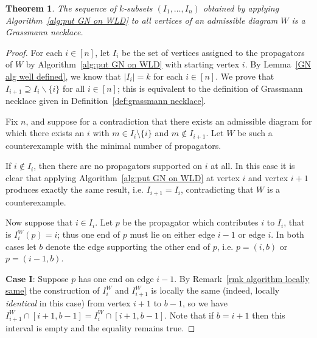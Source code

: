 \documentclass[11pt]{article}
\newcommand{\note}{\todo[color=green!40]}
\def\bas #1\eas{\begin{align*} #1 \end{align*}}
\newtheorem{thm}{Theorem}[section]
\theoremstyle{remark}
\theoremstyle{definition}
\begin{document}
\begin{thm}\label{res:alg gives GN}
The sequence of $k$-subsets $(I_1,\dots,I_n)$ obtained by applying Algorithm~\ref{alg:put GN on WLD} to all vertices of an admissible diagram $W$ is a Grassmann necklace.
\end{thm}
\begin{proof}
For each $i \in [n]$, let $I_i$ be the set of vertices assigned to the propagators of $W$ by Algorithm~\ref{alg:put GN on WLD} with starting vertex $i$. By Lemma~\ref{GN alg well defined}, we know that $|I_i| = k$ for each $i \in [n]$. We prove that $I_{i+1} \supseteq I_i \backslash \{i\}$ for all $i \in [n]$; this is equivalent to the definition of Grassmann necklace given in Definition~\ref{def:grassmann necklace}.

Fix $n$, and suppose for a contradiction that there exists an admissible diagram for which there exists an $i$ with $m\in I_i\setminus \{i\}$ and $m \not\in I_{i+1}$.  Let $W$ be such a counterexample with the minimal number of propagators.

If $i \not\in I_i$, then there are no propagators supported on $i$ at all.  In this case it is clear that applying Algorithm~\ref{alg:put GN on WLD} at vertex $i$ and vertex $i+1$ produces exactly the same result, i.e. $I_{i+1} = I_i$, contradicting that $W$ is a counterexample.

Now suppose that $i \in I_i$.  Let $p$ be the propagator which contributes $i$ to $I_i$, that is $I^W_i(p) = i$; thus one end of $p$ must lie on either edge $i-1$ or edge $i$.  In both cases let $b$ denote the edge supporting the other end of $p$, i.e. $p = (i, b)$ or $p = (i-1, b)$.


\textbf{Case I}:  Suppose $p$ has one end on edge $i-1$. By Remark~\ref{rmk algorithm locally same} the construction of $I_i^W$ and $I_{i+1}^W$ is locally the same (indeed, locally {\em identical} in this case) from vertex $i+1$ to $b-1$, so we have $I_{i+1}^W \cap [i+1,b-1] = I_{i}^W \cap [i+1,b-1]$. Note that if $b = i+1$ then this interval is empty and the equality remains true.



\end{proof}
\end{document}
